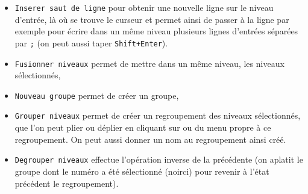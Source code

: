 \documentclass[a4paper,11pt]{article}
\begin{document}
\begin{itemize}
\item 
{\tt Inserer saut de ligne} pour obtenir une nouvelle ligne sur 
le niveau d'entr\'ee,
l\`a o\`u se trouve le curseur et permet ainsi de passer \`a la ligne par 
exemple pour \'ecrire dans un m\^eme niveau plusieurs lignes d'entr\'ees 
s\'epar\'ees par {\tt ;}  (on peut aussi taper {\tt Shift+Enter}).
\item{}
{\tt Fusionner niveaux} permet de mettre dans un m\^eme niveau, les niveaux 
s\'electionn\'es, 
\item{}
{\tt Nouveau groupe} permet de cr\'eer un groupe, 
\item{}
{\tt Grouper niveaux} permet de cr\'eer un regroupement 
des niveaux s\'electionn\'es, que l'on peut plier ou d\'eplier en cliquant sur
\framebox{\tt -} ou \framebox{\tt +} du menu propre \`a ce regroupement. 
On peut aussi donner un nom au regroupement ainsi cr\'e\'e.
\item{}
{\tt Degrouper niveaux} effectue l'op\'eration inverse de la pr\'ec\'edente (on 
aplatit le groupe dont le num\'ero a \'et\'e s\'electionn\'e (noirci) pour 
revenir \`a l'\'etat pr\'ec\'edent le regroupement).
\end{itemize}
\end{document}
